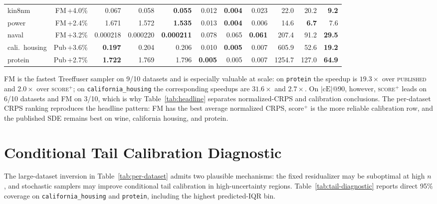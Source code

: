 \documentclass{tpm2026}
\begin{document}
\begin{table}[!h]
\begin{tabular}{lrrrrrrrrrr}
    kin8nm             & FM\,$+$4.0\%      & 0.067 & 0.058 & \textbf{0.055} & 0.012 & \textbf{0.004} & 0.023 & 22.0 & 20.2 & \textbf{9.2} \\
    power              & FM\,$+$2.4\%      & 1.671 & 1.572 & \textbf{1.535} & 0.013 & \textbf{0.004} & 0.006 & 14.6 & \textbf{6.7} & 7.6 \\
    naval              & FM\,$+$3.2\%      & 0.000218 & 0.000220 & \textbf{0.000211} & 0.078 & 0.065 & \textbf{0.061} & 207.4 & 91.2 & \textbf{29.5} \\
    cali.\ housing     & Pub\,$+$3.6\%     & \textbf{0.197} & 0.204 & 0.206 & 0.010 & \textbf{0.005} & 0.007 & 605.9 & 52.6 & \textbf{19.2} \\
    protein            & Pub\,$+$2.7\%     & \textbf{1.722} & 1.769 & 1.796 & \textbf{0.005} & 0.005 & 0.007 & 1254.7 & 127.0 & \textbf{64.9} \\
    \bottomrule
  \end{tabular}
\end{table}

FM is the fastest Treeffuser sampler on 9/10 datasets and is especially valuable at scale: on \texttt{protein} the speedup is $19.3\times$ over \textsc{published} and $2.0\times$ over \textsc{score$^+$}; on \texttt{california\_housing} the corresponding speedups are $31.6\times$ and $2.7\times$. On $|\text{cE}|$@90, however, \textsc{score$^+$} leads on 6/10 datasets and FM on 3/10, which is why Table~\ref{tab:headline} separates normalized-CRPS and calibration conclusions. The per-dataset CRPS ranking reproduces the headline pattern: FM has the best average normalized CRPS, score$^+$ is the more reliable calibration row, and the published SDE remains best on wine, california housing, and protein.

\section{Conditional Tail Calibration Diagnostic}\label{app:tail-diagnostic}

The large-dataset inversion in Table~\ref{tab:per-dataset} admits two plausible mechanisms: the fixed residualizer may be suboptimal at high $n$, and stochastic samplers may improve conditional tail calibration in high-uncertainty regions. Table~\ref{tab:tail-diagnostic} reports direct 95\% coverage on \texttt{california\_housing} and \texttt{protein}, including the highest predicted-IQR bin.
\end{document}
